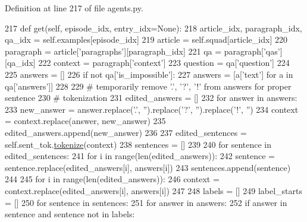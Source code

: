 Definition at line 217 of file agents.\+py.


\begin{DoxyCode}
217     \textcolor{keyword}{def }get(self, episode\_idx, entry\_idx=None):
218         article\_idx, paragraph\_idx, qa\_idx = self.examples[episode\_idx]
219         article = self.squad[article\_idx]
220         paragraph = article[\textcolor{stringliteral}{'paragraphs'}][paragraph\_idx]
221         qa = paragraph[\textcolor{stringliteral}{'qas'}][qa\_idx]
222         context = paragraph[\textcolor{stringliteral}{'context'}]
223         question = qa[\textcolor{stringliteral}{'question'}]
224 
225         answers = []
226         \textcolor{keywordflow}{if} \textcolor{keywordflow}{not} qa[\textcolor{stringliteral}{'is\_impossible'}]:
227             answers = [a[\textcolor{stringliteral}{'text'}] \textcolor{keywordflow}{for} a \textcolor{keywordflow}{in} qa[\textcolor{stringliteral}{'answers'}]]
228 
229         \textcolor{comment}{# temporarily remove '.', '?', '!' from answers for proper sentence}
230         \textcolor{comment}{# tokenization}
231         edited\_answers = []
232         \textcolor{keywordflow}{for} answer \textcolor{keywordflow}{in} answers:
233             new\_answer = answer.replace(\textcolor{stringliteral}{'.'}, \textcolor{stringliteral}{''}).replace(\textcolor{stringliteral}{'?'}, \textcolor{stringliteral}{''}).replace(\textcolor{stringliteral}{'!'}, \textcolor{stringliteral}{''})
234             context = context.replace(answer, new\_answer)
235             edited\_answers.append(new\_answer)
236 
237         edited\_sentences = self.sent\_tok.\hyperlink{namespaceparlai_1_1agents_1_1tfidf__retriever_1_1build__tfidf_a1fdb457e98eb4e4c26047e229686a616}{tokenize}(context)
238         sentences = []
239 
240         \textcolor{keywordflow}{for} sentence \textcolor{keywordflow}{in} edited\_sentences:
241             \textcolor{keywordflow}{for} i \textcolor{keywordflow}{in} range(len(edited\_answers)):
242                 sentence = sentence.replace(edited\_answers[i], answers[i])
243                 sentences.append(sentence)
244 
245         \textcolor{keywordflow}{for} i \textcolor{keywordflow}{in} range(len(edited\_answers)):
246             context = context.replace(edited\_answers[i], answers[i])
247 
248         labels = []
249         label\_starts = []
250         \textcolor{keywordflow}{for} sentence \textcolor{keywordflow}{in} sentences:
251             \textcolor{keywordflow}{for} answer \textcolor{keywordflow}{in} answers:
252                 \textcolor{keywordflow}{if} answer \textcolor{keywordflow}{in} sentence \textcolor{keywordflow}{and} sentence \textcolor{keywordflow}{not} \textcolor{keywordflow}{in} labels:

\end{DoxyCode}
